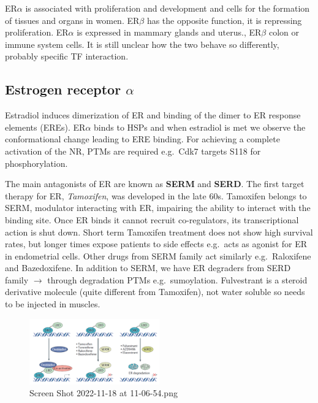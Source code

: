 ER$\alpha$ is associated with proliferation and development and cells for the formation of tissues and organs in women. ER$\beta$ has the opposite function, it is repressing proliferation. ER$\alpha$ is expressed in mammary glands and uterus., ER$\beta$ colon or immune system cells. It is still unclear how the two behave so differently, probably specific TF interaction.

\hypertarget{estrogen-receptor-alpha}{%
\subsection{\texorpdfstring{Estrogen receptor \(\alpha\)}{Estrogen receptor \textbackslash alpha}}\label{estrogen-receptor-alpha}}

Estradiol induces dimerization of ER and binding of the dimer to ER response elements (EREs). ER$\alpha$ binds to HSPs and when estradiol is met we observe the conformational change leading to ERE binding. For achieving a complete activation of the NR, PTMs are required e.g.~Cdk7 targets S118 for phosphorylation.

The main antagonists of ER are known as \textbf{SERM} and \textbf{SERD}. The first target therapy for ER, \emph{Tamoxifen}, was developed in the late 60s. Tamoxifen belongs to SERM, modulator interacting with ER, impairing the ability to interact with the binding site. Once ER binds it cannot recruit co-regulators, its transcriptional action is shut down. Short term Tamoxifen treatment does not show high survival rates, but longer times expose patients to side effects e.g.~acts as agonist for ER in endometrial cells. Other drugs from SERM family act similarly e.g.~Raloxifene and Bazedoxifene. In addition to SERM, we have ER degraders from SERD family $\rightarrow$ through degradation PTMs e.g.~sumoylation. Fulvestrant is a steroid derivative molecule (quite different from Tamoxifen), not water soluble so needs to be injected in muscles.

\begin{figure}
\centering
\includegraphics[width=0.5\textwidth]{../_resources/Screen_Shot_2022-11-18_at_11-06-54.png}
\caption{Screen Shot 2022-11-18 at 11-06-54.png}
\end{figure}

